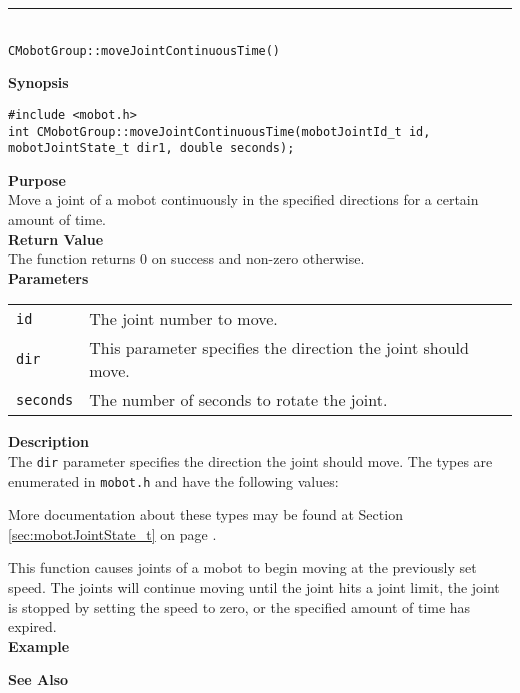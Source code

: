 \noindent
\vspace{5pt}
\rule{4.5in}{0.015in}\\
\noindent
{\LARGE \texttt{CMobotGroup::moveJointContinuousTime()}}\\
{}

\noindent
{\bf Synopsis}
\vspace{-8pt}
\begin{verbatim}
#include <mobot.h>
int CMobotGroup::moveJointContinuousTime(mobotJointId_t id, mobotJointState_t dir1, double seconds);
\end{verbatim}

\noindent
{\bf Purpose}\\
Move a joint of a mobot continuously in the specified directions for a certain amount of time.\\

\noindent
{\bf Return Value}\\
The function returns 0 on success and non-zero otherwise.\\

\noindent
{\bf Parameters}\\
\vspace{-0.1in}
\begin{description}
\item               
\begin{tabular}{p{10 mm}p{145 mm}}
\texttt{id} & The joint number to move. \\
\texttt{dir} & This parameter specifies the direction the joint should move. \\
\texttt{seconds} & The number of seconds to rotate the joint. \\
\end{tabular}
\end{description}

\noindent
{\bf Description}\\
The \texttt{dir} parameter specifies the direction the joint should move.
The types
are enumerated in \texttt{mobot.h} and have the following values:

More documentation about these types may be found at Section
\ref{sec:mobotJointState_t} on page
\pageref{sec:mobotJointState_t}.  

This function causes joints of a mobot to begin moving at the previously set
speed. The joints will continue moving until the joint hits a joint limit, 
the joint is stopped by setting the speed to zero, or the specified amount of
time has expired. \\

\noindent
{\bf Example}\\
\noindent

\noindent
{\bf See Also}\\

